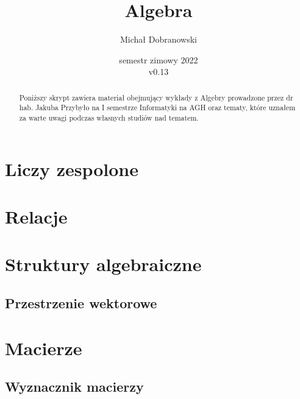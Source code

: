 \documentclass[11pt]{scrartcl}
\title{Algebra}
\author{Michał Dobranowski}
\date{semestr zimowy 2022 \\ v0.13}
\begin{document}
    \maketitle
    \begin{abstract}
        Poniższy skrypt zawiera materiał obejmujący wykłady z Algebry prowadzone przez dr hab. Jakuba Przybyło na I semestrze Informatyki na AGH oraz tematy, które uznałem za warte uwagi podczas własnych studiów nad tematem.
    \end{abstract}
    \tableofcontents
    \eject

    \section{Liczy zespolone}
    

    \section{Relacje}
    

    \section{Struktury algebraiczne}
    

        \subsection{Przestrzenie wektorowe}
        


    \section{Macierze}
    

        \subsection{Wyznacznik macierzy}
        
\end{document}
